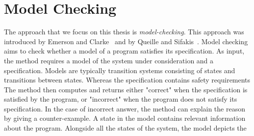 \chapter{Model Checking}
\label{section:model:checking}
%
%
%

The approach that we focus on this thesis is
\emph{model-checking}.
%
%
This approach was introduced by Emerson and Clarke~\cite{CE82} and by Queille and Sifakis~\cite{QS82}. 
Model checking aims to check whether a model of a program satisfies its  specification.
  As input, the method requires a model of the system under consideration and a specification.
Models are typically transition systems consisting of states and transitions between states.
Whereas the specification contains safety requirements 
  The method then computes and returns either "correct" when the specification is satisfied by the program, or "incorrect" when the program does not satisfy its specification. In the case of incorrect answer, the method can explain the reason by giving a counter-example.
 A state in the model contains relevant information about the program.
Alongside all the states of the system, the model depicts the
